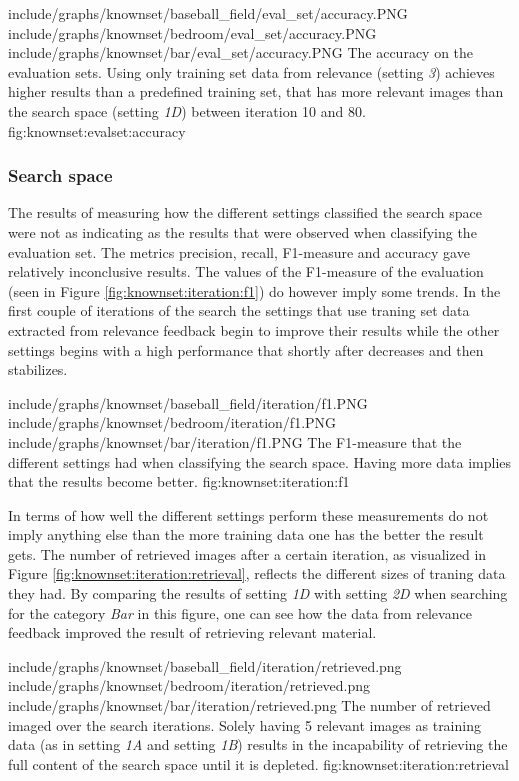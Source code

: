 \tripfigure
{include/graphs/knownset/baseball_field/eval_set/accuracy.PNG}
{include/graphs/knownset/bedroom/eval_set/accuracy.PNG}
{include/graphs/knownset/bar/eval_set/accuracy.PNG}
{The accuracy on the evaluation sets. Using only training set data from relevance (setting \emph{3}) achieves higher results than a predefined training set, that has more relevant images than the search space (setting \emph{1D}) between iteration 10 and 80.}
{fig:knownset:evalset:accuracy}

\subsubsection{Search space}
\label{sec:res:knownset:iter}

The results of measuring how the different settings classified the search space were not as indicating as the results that were observed when classifying the evaluation set. 
The metrics precision, recall, F1-measure and accuracy gave relatively inconclusive results. The values of the F1-measure of the evaluation (seen in Figure \ref{fig:knownset:iteration:f1}) do however imply some trends. In the first couple of iterations of the search the settings that use traning set data extracted from relevance feedback begin to improve their results while the other settings begins with a high performance that shortly after decreases and then stabilizes.  

\tripfigurenear
{include/graphs/knownset/baseball_field/iteration/f1.PNG}
{include/graphs/knownset/bedroom/iteration/f1.PNG}
{include/graphs/knownset/bar/iteration/f1.PNG}
{The F1-measure that the different settings had when classifying the search space. Having more data implies that the results become better.}
{fig:knownset:iteration:f1}

In terms of how well the different settings perform these measurements do not imply anything else than the more training data one has the better the result gets. The number of retrieved images after a certain iteration, as visualized in Figure \ref{fig:knownset:iteration:retrieval}, reflects the different sizes of traning data they had. By comparing the results of setting \emph{1D} with setting \emph{2D} when searching for the category \emph{Bar} in this figure, one can see how the data from relevance feedback improved the result of retrieving relevant material.

\tripfigurenear
{include/graphs/knownset/baseball_field/iteration/retrieved.png}
{include/graphs/knownset/bedroom/iteration/retrieved.png}
{include/graphs/knownset/bar/iteration/retrieved.png}
{The number of retrieved imaged over the search iterations. Solely having 5 relevant images as training data (as in setting \emph{1A} and setting \emph{1B}) results in the incapability of retrieving the full content of the search space until it is depleted.}
{fig:knownset:iteration:retrieval}

